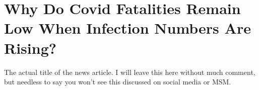 \chapter{Why Do Covid Fatalities Remain Low When Infection Numbers Are Rising?}

\begin{refsection}

The actual title of the news article. I will leave this here without much comment, but needless to say you won't see this discussed on social media or MSM.\textsuperscript{\cite{url7bd3c557}}

\printbibliography[heading=subbibliography]

\end{refsection}
